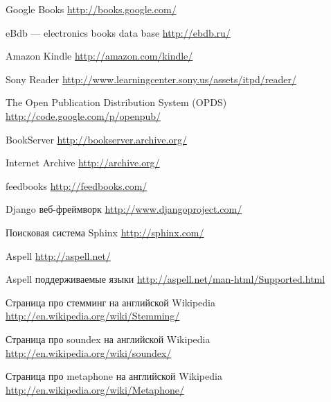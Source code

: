 \begin{thebibliography}{99}

 Google Books \url{http://books.google.com/}

 eBdb --- electronics books data base \url{http://ebdb.ru/}

 Amazon Kindle \url{http://amazon.com/kindle/}

 Sony Reader \url{http://www.learningcenter.sony.us/assets/itpd/reader/}

 The Open Publication Distribution System (OPDS) \url{http://code.google.com/p/openpub/}

 BookServer \url{http://bookserver.archive.org/}

 Internet Archive \url{http://archive.org/}

 feedbooks \url{http://feedbooks.com/}

 Django веб-фреймворк \url{http://www.djangoproject.com/}


 Поисковая система Sphinx \url{http://sphinx.com/}

 Aspell \url{http://aspell.net/}

 Aspell поддерживаемые языки \url{http://aspell.net/man-html/Supported.html}

 Страница про стемминг на английской Wikipedia \url{http://en.wikipedia.org/wiki/Stemming/}

 Страница про soundex на английской Wikipedia \url{http://en.wikipedia.org/wiki/soundex/}

 Страница про metaphone на английской Wikipedia \url{http://en.wikipedia.org/wiki/Metaphone/}




\end{thebibliography}